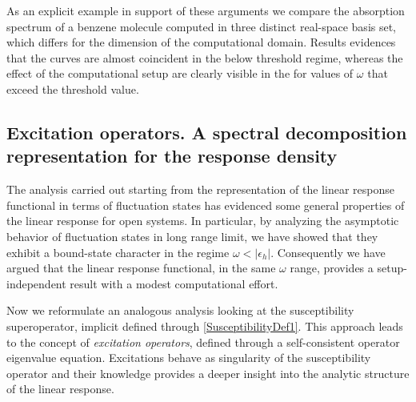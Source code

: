 \documentclass[reprint,aps,prb]{revtex4-1}
\newcommand{\eps}{\epsilon}
\begin{document}
As an explicit example in support of these arguments we compare the absorption spectrum of a benzene molecule computed in three distinct real-space basis set, which differs for the 
dimension of the computational domain. Results evidences that the curves are almost coincident in the below threshold regime, whereas the effect of the computational setup are clearly
visible in the for values of $\omega$ that exceed the threshold value. 


\vspace{0.3cm}
\vspace{0.3cm}


\subsection{Excitation operators. A spectral decomposition representation for the response density}

The analysis carried out starting from the representation of the linear response functional in terms of fluctuation states has evidenced some general properties of the linear response
for open systems. In particular, by analyzing the asymptotic behavior of fluctuation states in long range limit, we have showed that they exhibit a bound-state character in the regime  
$\omega<|\eps_h|$. Consequently we have argued that the linear response functional, in the same $\omega$ range, provides a setup-independent result with a modest computational effort. 

Now we reformulate an analogous analysis looking at the susceptibility superoperator, implicit defined through \eqref{SusceptibilityDef1}. This approach leads to the concept of \emph{excitation 
operators}, defined through a self-consistent operator eigenvalue equation. Excitations behave as singularity of the susceptibility operator and their knowledge provides a deeper insight 
into the analytic structure of the linear response. 
\end{document}
